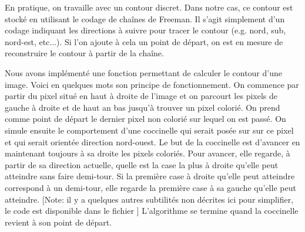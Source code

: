 En pratique, on travaille avec un contour discret. 
Dans notre cas, ce contour est stocké en utilisant le codage 
de chaînes de Freeman.
Il s'agit simplement d'un codage indiquant les directions à suivre 
pour tracer le contour (e.g.\/ nord, sub, nord-est, etc...).
Si l'on ajoute à cela un point de départ, on est en mesure de 
reconstruire le contour à partir de la chaîne.


Nous avons implémenté une fonction permettant de calculer le 
contour d'une image.
Voici en quelques mots son principe de fonctionnement. 
On commence par partir du pixel situé en haut à droite de l'image 
et on parcourt les pixels de gauche à droite et de haut an bas 
jusqu'à trouver un pixel colorié. 
On prend comme point de départ le dernier pixel non colorié sur lequel 
on est passé.
On simule ensuite le comportement d'une coccinelle qui serait posée sur 
sur ce pixel et qui serait orientée direction nord-ouest. 
Le but de la coccinelle est d'avancer en maintenant toujours à sa 
droite les pixels coloriés. 
Pour avancer, elle regarde, à partir de sa direction actuelle, quelle 
est la case la plus à droite qu'elle peut atteindre sans faire demi-tour.
Si la première case à droite qu'elle peut atteindre correspond à un demi-tour, 
elle regarde la première case à sa gauche qu'elle peut atteindre.
[Note: il y a quelques autres subtilités non décrites ici pour simplifier, 
le code est disponible dans le fichier ]
L'algorithme se termine quand la coccinelle revient à son point de départ.

